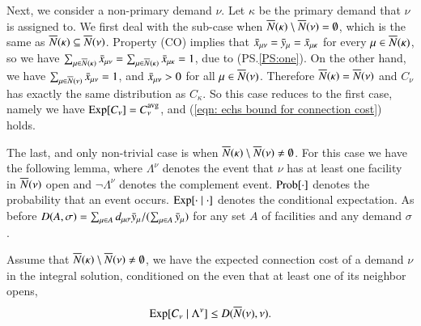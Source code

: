 Next, we consider a non-primary demand $\nu$. Let $\kappa$
be the primary demand that $\nu$ is assigned to. We first
deal with the sub-case when ${\overline{N}}(\kappa)\setminus
{\overline{N}}(\nu) = \emptyset$, which is the same as
${\overline{N}}(\kappa) \subseteq {\overline{N}}(\nu)$. Property (CO)
implies that ${\bar x}_{\mu\nu} = {\bar y}_{\mu} =
{\bar x}_{\mu\kappa}$ for every $\mu \in {\overline{N}}(\kappa)$, so we
have $\sum_{\mu\in{\overline{N}}(\kappa)} {\bar x}_{\mu\nu} =
\sum_{\mu\in{\overline{N}}(\kappa)} {\bar x}_{\mu\kappa} = 1$, due to
(PS.\ref{PS:one}). On the other hand, we have
$\sum_{\mu\in{\overline{N}}(\nu)} {\bar x}_{\mu\nu} = 1$, and
${\bar x}_{\mu\nu} > 0$ for all $\mu\in {\overline{N}}(\nu)$. Therefore
${\overline{N}}(\kappa) = {\overline{N}}(\nu)$ and $C_\nu$ has exactly the
same distribution as $C_\kappa$.  So this case reduces to
the first case, namely we have $\mbox{\rm Exp}[C_{\nu}] =
C^{{\mbox{\scriptsize\rm avg}}}_{\nu}$, and (\ref{eqn: echs bound for connection
  cost}) holds.

The last, and only non-trivial case is when ${\overline{N}}(\kappa)\setminus
{\overline{N}}(\nu)\neq\emptyset$. For this case we have the following lemma,
where $\Lambda^\nu$ denotes the event that $\nu$ has at least one
facility in ${\overline{N}}(\nu)$ open and $\neg \Lambda^\nu$ denotes the
complement event. $\mbox{\rm Prob}[\cdot]$ denotes the probability that an event
occurs. $\mbox{\rm Exp}[\cdot \mid \cdot]$ denotes the conditional
expectation. As before $D(A, \sigma) = \sum_{\mu \in A} d_{\mu\sigma}
{\bar y}_{\mu} / (\sum_{\mu \in A} {\bar y}_{\mu})$ for any set $A$ of
facilities and any demand $\sigma$.


\begin{lemma}\label{lem: echs expected C_nu}
Assume that ${\overline{N}}(\kappa) \setminus {\overline{N}}(\nu) \neq \emptyset$, we
have the expected connection cost of a demand $\nu$ in the integral
solution, conditioned on the even that at least one of its neighbor
opens,
%
\begin{equation*}
  \mbox{\rm Exp}[C_\nu \mid \Lambda^\nu] \leq D({\overline{N}}(\nu), \nu).
\end{equation*}
\end{lemma}

